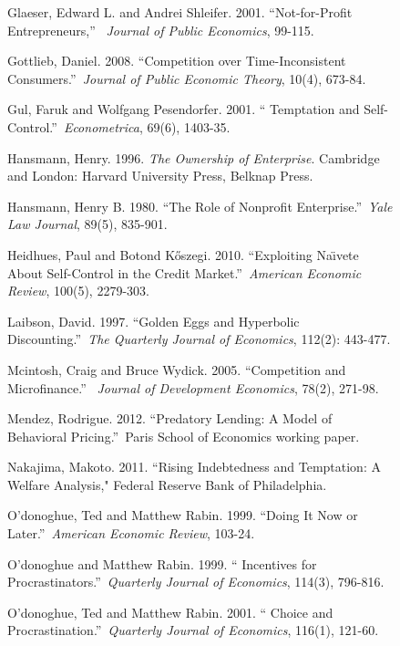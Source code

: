 \documentclass[11pt]{article}%
\begin{document}
\begin{figure}
{\begin{thebibliography}{99}
Glaeser, Edward L. and Andrei Shleifer. 2001.
\textquotedblleft Not-for-Profit Entrepreneurs,\textquotedblright%
\ \textit{Journal of Public Economics}, 99-115.

Gottlieb, Daniel. 2008. \textquotedblleft Competition
over Time-Inconsistent Consumers.\textquotedblright\ \textit{Journal of Public
Economic Theory}, 10(4), 673-84.

\bibitem {}Gul, Faruk and Wolfgang Pesendorfer. 2001. \textquotedblleft
Temptation and Self-Control.\textquotedblright\ \textit{Econometrica}, 69(6), 1403-35.

\bibitem {}Hansmann, Henry. 1996. \emph{The Ownership of Enterprise}.
Cambridge and London: Harvard University Press, Belknap Press.

\bibitem {}Hansmann, Henry B. 1980. \textquotedblleft The Role of Nonprofit
Enterprise.\textquotedblright\ \textit{Yale Law Journal}, 89(5), 835-901.

Heidhues, Paul and Botond K\H{o}szegi. 2010.
\textquotedblleft Exploiting Na\"{\i}vete About Self-Control in the Credit
Market.\textquotedblright\ \textit{American Economic Review}, 100(5), 2279-303.

Laibson, David. 1997. \textquotedblleft Golden Eggs and
Hyperbolic Discounting.\textquotedblright\ \textit{The Quarterly Journal of
Economics}, 112(2): 443-477.

Mcintosh, Craig and Bruce Wydick. 2005.
\textquotedblleft Competition and Microfinance.\textquotedblright%
\ \textit{Journal of Development Economics}, 78(2), 271-98.

Mendez, Rodrigue. 2012. \textquotedblleft Predatory
Lending: A Model of Behavioral Pricing.\textquotedblright\ Paris School of
Economics working paper.

Nakajima, Makoto. 2011. \textquotedblleft Rising
Indebtedness and Temptation: A Welfare Analysis," Federal Reserve Bank of Philadelphia.

O'donoghue, Ted and Matthew Rabin. 1999.
\textquotedblleft Doing It Now or Later.\textquotedblright\ \textit{American
Economic Review}, 103-24.

O'donoghue and Matthew Rabin. 1999. \textquotedblleft
Incentives for Procrastinators.\textquotedblright\ \textit{Quarterly Journal
of Economics}, 114(3), 796-816.

O'donoghue, Ted and Matthew Rabin. 2001. \textquotedblleft
Choice and Procrastination.\textquotedblright\ \textit{Quarterly Journal of
Economics}, 116(1), 121-60.


\end{thebibliography}}
\end{figure}
\end{document}
